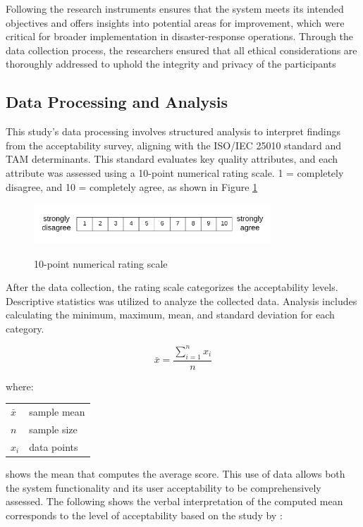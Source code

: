 	Following the research instruments ensures that the system meets its intended objectives and offers insights into potential areas for improvement, which were critical for broader implementation in disaster-response operations. Through the data collection process, the researchers ensured that all ethical considerations are thoroughly addressed to uphold the integrity and privacy of the participants

\subsection{Data Processing and Analysis}
	This study's data processing involves structured analysis to interpret findings from the acceptability survey, aligning with the ISO/IEC 25010 standard and TAM determinants. This standard evaluates key quality attributes, and each attribute was assessed using a 10-point numerical rating scale. 1 = completely disagree, and 10 = completely agree, as shown in Figure \ref{Nrs}
	
	\begin{figure}[h!]
		\caption{10-point numerical rating scale}
		\centering
		\includegraphics[width=3.5in]{Nrs-10}
		\label{Nrs}
	\end{figure}
	
	After the data collection, the rating scale categorizes the acceptability levels. Descriptive statistics was utilized to analyze the collected data. Analysis includes calculating the minimum, maximum, mean, and standard deviation for each category.
	
	\begin{equation*} 
		\label{mean}
		\bar{x} = \frac{\sum_{i=1}^{n} x_{i}}{n}
	\end{equation*}
	
	\noindent where: \\
	\begin{tabular}{@{}ll}
	$\bar{x}$ & sample mean \\
	$n$ & sample size \\
	$x_{i}$ & data points \\
	\end{tabular}
	
	\noindent shows the mean that computes the average score. This use of data allows both the system functionality and its user acceptability to be comprehensively assessed. The following shows the verbal interpretation of the computed mean corresponds to the level of acceptability based on the study by \textcite{Eladia2024}:
	
